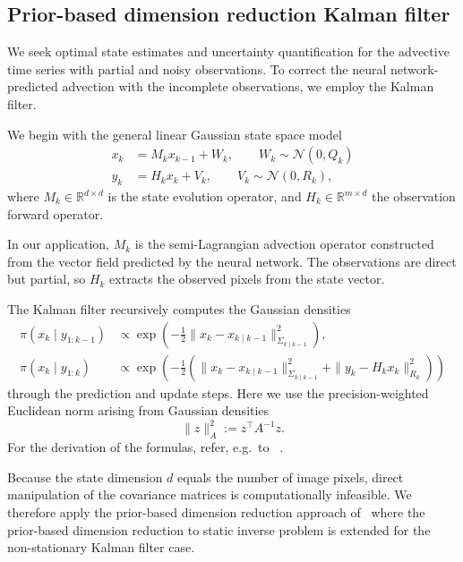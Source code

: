 \documentclass[a4paper,12pt]{article}
\begin{document}
\subsection{Prior-based dimension reduction Kalman filter}
We seek optimal state estimates and uncertainty quantification for the advective time series with partial and noisy observations.
To correct the neural network-predicted advection with the incomplete observations, we employ the Kalman filter.

We begin with the general linear Gaussian state space model
\begin{align}
    x_{k} &= M_{k} x_{k-1} + W_{k}, \qquad W_{k} \sim \mathcal{N}(0, Q_{k})\\
    y_{k} &= H_{k}x_{k} + V_{k}, \qquad V_{k} \sim \mathcal{N}(0, R_{k}),
\end{align}
where $M_{k} \in \mathbb{R}^{d \times d}$ is the state evolution operator, and $H_{k} \in \mathbb{R}^{m \times d}$ the observation forward operator.

In our application, $M_k$ is the semi-Lagrangian advection operator constructed from the vector field predicted by the neural network.
The observations are direct but partial, so $H_k$ extracts the observed pixels from the state vector.

The Kalman filter recursively computes the Gaussian densities
\begin{align}
    \pi(x_k \mid y_{1:k-1}) &\propto \exp\!\left( - \tfrac{1}{2} \| x_k - x_{k \mid k-1} \|_{\Sigma_{k \mid k-1}}^2 \right), \label{eq:filterprior} \\
    \pi(x_k \mid y_{1:k}) &\propto \exp\!\left( - \tfrac{1}{2} \left( \| x_k - x_{k \mid k-1} \|_{\Sigma_{k \mid k-1}}^2 + \| y_k - H_k x_k\|_{R_k}^{2}\right) \right) \label{eq:filterposterior}
\end{align}
through the prediction and update steps.
Here we use the precision-weighted Euclidean norm arising from Gaussian densities
\[
    \|z\|_{A}^2 := z^\top A^{-1} z.
\]
For the derivation of the formulas, refer, e.g.\ to ~\cite{kaipiosomersalo}.

Because the state dimension $d$ equals the number of image pixels, direct manipulation of the covariance matrices is computationally infeasible.
We therefore apply the prior-based dimension reduction approach of~\cite{solonen} where the prior-based dimension reduction to static inverse problem is extended for the non-stationary Kalman filter case.
\end{document}
